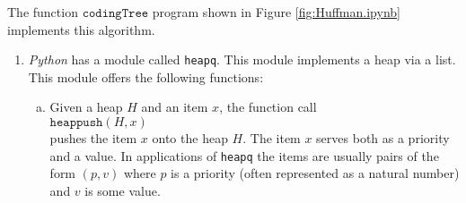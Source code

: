\noindent
The function $\texttt{codingTree}$ program shown in Figure \ref{fig:Huffman.ipynb} implements this algorithm.
\begin{enumerate}
\item \textsl{Python} has a module called \texttt{heapq}.  This module implements a heap via a list.
      This module offers the following functions:
      \begin{enumerate}[(a)]
      \item Given a heap $H$ and an item $x$, the function call
            \\[0.2cm]
            \hspace*{1.3cm}
            $\texttt{heappush}(H, x)$
            \\[0.2cm]
            pushes the item $x$ onto the heap $H$.  The item $x$ serves both as a priority and a value.
            In applications of \texttt{heapq} the items are usually pairs of the form $(p, v)$ where $p$ is a
            priority (often represented as a natural number) and $v$ is some value.


\end{enumerate}
\end{enumerate}
